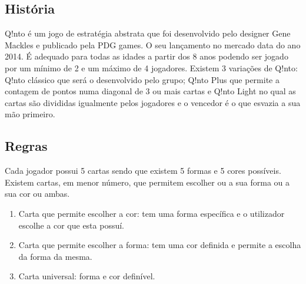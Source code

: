 \documentclass[a4paper]{article}
\begin{document}
\subsection{História}

Q!nto é um jogo de estratégia abstrata que foi desenvolvido pelo designer Gene Mackles e publicado pela PDG games. O seu lançamento no mercado data do ano 2014. É adequado para todas as idades a partir dos 8 anos podendo ser jogado por um mínimo de 2 e um máximo de 4 jogadores. Existem 3 variações de Q!nto: Q!nto clássico que será o desenvolvido pelo grupo; Q!nto Plus que permite a contagem de pontos numa diagonal de 3 ou mais cartas e Q!nto Light no qual as cartas são divididas igualmente pelos jogadores e o vencedor é o que esvazia a sua mão primeiro. 

\subsection{Regras}

Cada jogador possui 5 cartas sendo que existem 5 formas e 5 cores possíveis. Existem cartas, em menor número, que permitem escolher ou a sua forma ou a sua cor ou ambas.

\begin{enumerate}
	\item Carta que permite escolher a cor: tem uma forma específica e o utilizador escolhe a cor que esta possuí. 
	\item Carta que permite escolher a forma: tem uma cor definida e permite a escolha da forma da mesma.
	\item Carta universal: forma e cor definível. 
\end{enumerate}
\end{document}
